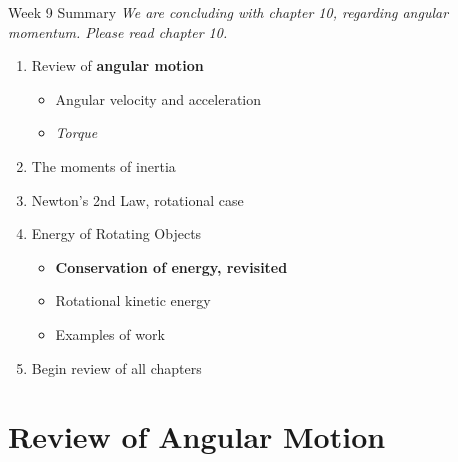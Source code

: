 \documentclass{beamer}
\begin{document}
\begin{frame}{Week 9 Summary}
\textit{We are concluding with chapter 10, regarding angular momentum. Please read chapter 10.}
\begin{enumerate}
\item Review of \textbf{angular motion}
\begin{itemize}
\item Angular velocity and acceleration
\item \textit{Torque}
\end{itemize}
\item \alert{The moments of inertia}
\item Newton's 2nd Law, rotational case
\item Energy of Rotating Objects
\begin{itemize}
\item \textbf{Conservation of energy, revisited}
\item Rotational kinetic energy
\item Examples of work
\end{itemize}
\item Begin review of all chapters
\end{enumerate}
\end{frame}

\section{Review of Angular Motion}
\end{document}
